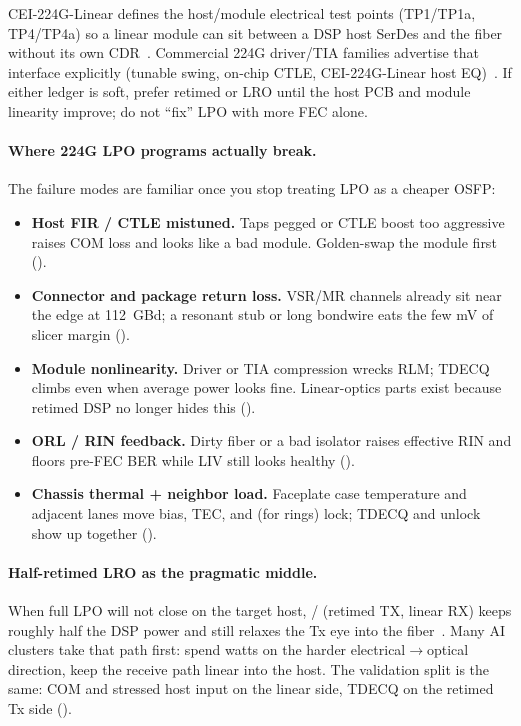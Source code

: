 CEI-224G-Linear defines the host/module electrical test points (TP1/TP1a,
TP4/TP4a) so a linear module can sit between a DSP host SerDes and the fiber
without its own CDR~. Commercial 224G driver/TIA families
advertise that interface explicitly (tunable swing, on-chip CTLE, CEI-224G-Linear
host EQ)~. If either ledger is soft, prefer
retimed or LRO until the host PCB and module linearity improve; do not ``fix''
LPO with more FEC alone.

\paragraph{Where 224G LPO programs actually break.}
The failure modes are familiar once you stop treating LPO as a cheaper OSFP:

\begin{itemize}
\item \textbf{Host FIR / CTLE mistuned.} Taps pegged or CTLE boost too aggressive
      raises COM loss and looks like a bad module. Golden-swap the module first
      ().
\item \textbf{Connector and package return loss.} VSR/MR channels already sit near
      the edge at 112~GBd; a resonant stub or long bondwire eats the few mV of
      slicer margin ().
\item \textbf{Module nonlinearity.} Driver or TIA compression wrecks RLM; TDECQ
      climbs even when average power looks fine. Linear-optics parts exist because
      retimed DSP no longer hides this ().
\item \textbf{ORL / RIN feedback.} Dirty fiber or a bad isolator raises effective
      RIN and floors pre-FEC BER while LIV still looks healthy
      ().
\item \textbf{Chassis thermal + neighbor load.} Faceplate case temperature and
      adjacent lanes move bias, TEC, and (for rings) lock; TDECQ and unlock show
      up together ().
\end{itemize}

\paragraph{Half-retimed LRO as the pragmatic middle.}
When full LPO will not close on the target host, / (retimed
TX, linear RX) keeps roughly half the DSP power and still relaxes the Tx eye
into the fiber~. Many AI clusters take that path first: spend
watts on the harder electrical$\to$optical direction, keep the receive path
linear into the host. The validation split is the same: COM and stressed host
input on the linear side, TDECQ on the retimed Tx side
().

